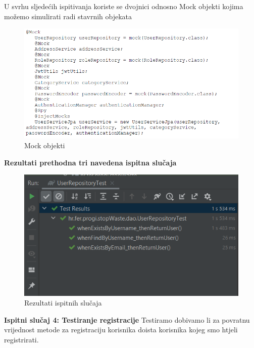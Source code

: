 		U svrhu sljedećih ispitivanja koriste se dvojnici odnosno Mock objekti kojima možemo simulirati radi stavrnih objekata
		
		\begin{figure}[H]
			\includegraphics[scale=0.7]{slike/test3a.PNG} %
			\centering
			\caption{Mock objekti}
			\label{fig:test3a}
		\end{figure}
	
		
		\textbf{Rezultati prethodna tri navedena ispitna slučaja }
		
		\begin{figure}[H]
			\includegraphics[scale=0.8]{slike/rezultati1.PNG} %
			\centering
			\caption{Rezultati ispitnih slučaja}
			\label{fig:rez1}
		\end{figure} 
		
		\textbf{Ispitni slučaj 4: Testiranje registracije}
		Testiramo dobivamo li za povratnu vrijednost metode za registraciju korisnika doista korisnika kojeg smo htjeli registrirati.
		

